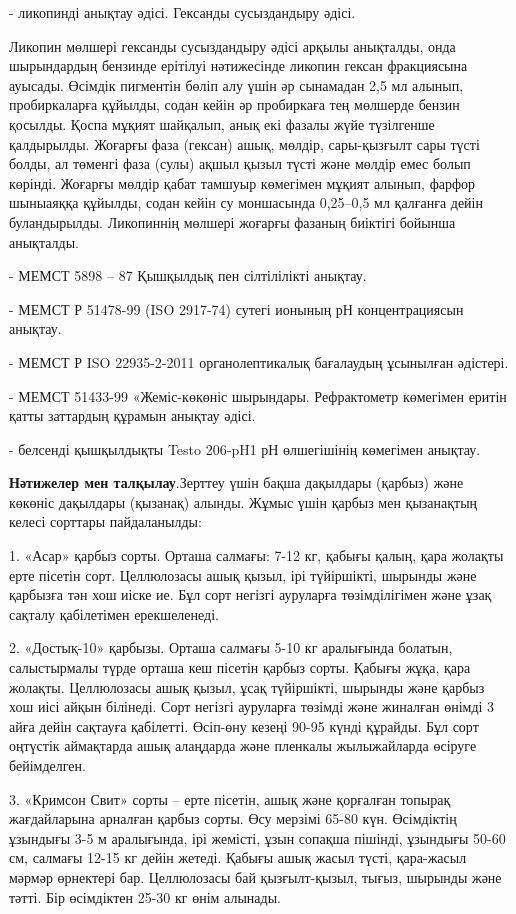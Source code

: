 \begin{multicols}{2}
- ликопинді анықтау әдісі. Гександы сусыздандыру әдісі.

Ликопин мөлшері гександы сусыздандыру әдісі арқылы анықталды, онда
шырындардың бензинде ерітілуі нәтижесінде ликопин гексан фракциясына
ауысады. Өсімдік пигментін бөліп алу үшін әр сынамадан 2,5 мл алынып,
пробиркаларға құйылды, содан кейін әр пробиркаға тең мөлшерде бензин
қосылды. Қоспа мұқият шайқалып, анық екі фазалы жүйе түзілгенше
қалдырылды. Жоғарғы фаза (гексан) ашық, мөлдір, сары-қызғылт сары түсті
болды, ал төменгі фаза (сулы) ақшыл қызыл түсті және мөлдір емес болып
көрінді. Жоғарғы мөлдір қабат тамшуыр көмегімен мұқият алынып, фарфор
шыныаяққа құйылды, содан кейін су моншасында 0,25--0,5 мл қалғанға дейін
буландырылды. Ликопиннің мөлшері жоғарғы фазаның биіктігі бойынша
анықталды.

- МЕМСТ 5898 -- 87 Қышқылдық пен сілтілілікті анықтау.

- МЕМСТ Р 51478-99 (ISO 2917-74) сутегі ионының рН концентрациясын
анықтау.

- МЕМСТ Р ISO 22935-2-2011 органолептикалық бағалаудың ұсынылған
әдістері.

- МЕМСТ 51433-99 «Жеміс-көкөніс шырындары. Рефрактометр көмегімен еритін
қатты заттардың құрамын анықтау әдісі.

- белсенді қышқылдықты Testo 206-pH1 рН өлшегішінің көмегімен анықтау.

{\bfseries Нәтижелер мен талқылау}.Зерттеу үшін бақша дақылдары (қарбыз)
және көкөніс дақылдары (қызанақ) алынды. Жұмыс үшін қарбыз мен
қызанақтың келесі сорттары пайдаланылды:

1. «Асар» қарбыз сорты. Орташа салмағы: 7-12 кг, қабығы қалың, қара
жолақты ерте пісетін сорт. Целлюлозасы ашық қызыл, ірі түйіршікті,
шырынды және қарбызға тән хош иіске ие. Бұл сорт негізгі ауруларға
төзімділігімен және ұзақ сақталу қабілетімен ерекшеленеді.

2. «Достық-10» қарбызы. Орташа салмағы 5-10 кг аралығында болатын,
салыстырмалы түрде орташа кеш пісетін қарбыз сорты. Қабығы жұқа, қара
жолақты. Целлюлозасы ашық қызыл, ұсақ түйіршікті, шырынды және қарбыз
хош иісі айқын білінеді. Сорт негізгі ауруларға төзімді және жиналған
өнімді 3 айға дейін сақтауға қабілетті. Өсіп-өну кезеңі 90-95 күнді
құрайды. Бұл сорт оңтүстік аймақтарда ашық алаңдарда және пленкалы
жылыжайларда өсіруге бейімделген.

3. «Кримсон Свит» сорты -- ерте пісетін, ашық және қорғалған топырақ
жағдайларына арналған қарбыз сорты. Өсу мерзімі 65-80 күн. Өсімдіктің
ұзындығы 3-5 м аралығында, ірі жемісті, ұзын сопақша пішінді, ұзындығы
50-60 см, салмағы 12-15 кг дейін жетеді. Қабығы ашық жасыл түсті,
қара-жасыл мәрмәр өрнектері бар. Целлюлозасы бай қызғылт-қызыл, тығыз,
шырынды және тәтті. Бір өсімдіктен 25-30 кг өнім алынады.


\end{multicols}
